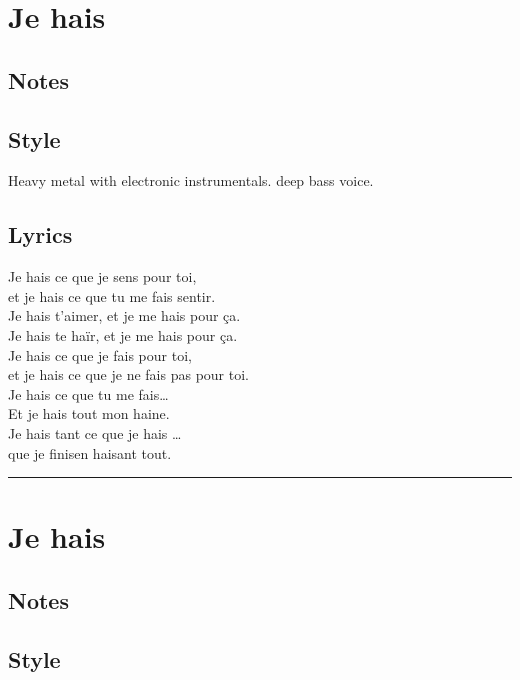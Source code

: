 \section{Je hais}\label{je-hais}

\subsection{Notes}\label{notes-5}

\subsection{Style}\label{style-4}

Heavy metal with electronic instrumentals. deep bass voice.

\subsection{Lyrics}\label{lyrics-4}

Je hais ce que je sens pour toi,\\
et je hais ce que tu me fais sentir.\\
Je hais t'aimer, et je me hais pour ça.\\
Je hais te haïr, et je me hais pour ça.\\
Je hais ce que je fais pour toi,\\
et je hais ce que je ne fais pas pour toi.\\
Je hais ce que tu me fais\ldots{}\\
Et je hais tout mon haine.\\
Je hais tant ce que je hais \ldots{}\\
que je finisen haisant tout.

\begin{center}\rule{0.5\linewidth}{0.5pt}\end{center}

\section{Je hais}\label{je-hais-1}

\subsection{Notes}\label{notes-6}

\subsection{Style}\label{style-5}

